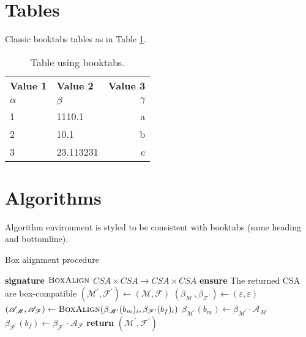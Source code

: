 \section{Tables}
Classic booktabs tables as in Table \ref{tab:table}. \blindtext
\begin{table}
    \begin{center}
      \caption{Table using booktabs.}
      \label{tab:table}
      \begin{tabular}{llr}
        \toprule %
        \textbf{Value 1} & \textbf{Value 2} & \textbf{Value 3}\\
        $\alpha$ & $\beta$ & $\gamma$ \\
        \midrule %
        1 & 1110.1 & a\\
        2 & 10.1 & b\\
        3 & 23.113231 & c\\
        \bottomrule %
      \end{tabular}
    \end{center}
\end{table}

\section{Algorithms}
Algorithm environment is styled to be consistent with booktabs (same heading and bottomline). \blindtext[2]
\begin{algorithm}
    \caption{Box alignment procedure}\label{alg:padding}
    \begin{algorithmic}[1]
        \Statex \textbf{signature} $\textsc{BoxAlign}$ $CSA\times CSA \to CSA\times CSA$
        \Statex \textbf{ensure} The returned CSA are box-compatible
            \State $(\mathscr{M}^\prime,\mathscr{F}^\prime)\gets(\mathscr{M},\mathscr{F})$
                \State $\left(\beta_{\mathscr{M}^\prime},\beta_{\mathscr{F}^\prime}\right)\gets(\varepsilon,\varepsilon)$
                    \State $(\mathscr{A}_\mathscr{M},\mathscr{A}_\mathscr{F})\gets\textsc{BoxAlign}(\beta_{\mathscr{M}^\prime}(b_m)_i,\beta_{\mathscr{F}^\prime}(b_f)_i)$
                    \State $\beta_{\mathscr{M}^\prime}(b_m)\gets\beta_{\mathscr{M}^\prime}\cdot\mathscr{A}_\mathscr{M}$
                    \State $\beta_{\mathscr{F}^\prime}(b_f)\gets\beta_{\mathscr{F}^\prime}\cdot\mathscr{A}_\mathscr{F}$
                \EndFor
            \EndFor
            \State \textbf{return} $(\mathscr{M}^\prime,\mathscr{F}^\prime)$
        \EndFunction
    \end{algorithmic}
\end{algorithm}



